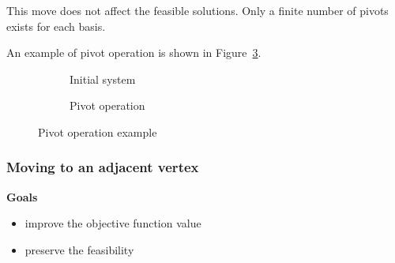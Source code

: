 \documentclass[english]{article}
\begin{document}
This move does not affect the feasible solutions.
Only a finite number of pivots exists for each basis.

\bigskip
An example of pivot operation is shown in Figure~\ref{fig:pivot-operation-example}.

\begin{figure}[htbp]
  \centering
  \bigskip
  \begin{subfigure}[b]{0.495\textwidth}
    \centering
    \bigskip
    \caption{Initial system}
    \label{fig:pivot-operation-example-1}
    \bigskip
  \end{subfigure}
  \begin{subfigure}[b]{0.495\textwidth}
    \centering
    \bigskip
    \caption{Pivot operation}
    \bigskip
    \label{fig:pivot-operation-example-2}
  \end{subfigure}

  \caption{Pivot operation example}
  \label{fig:pivot-operation-example}
  \bigskip
\end{figure}

\subsubsection{Moving to an adjacent vertex}

\textbf{Goals}
\begin{itemize}[label=\(\rightarrow\)]
  \item improve the objective function value
  \item preserve the feasibility
\end{itemize}
\end{document}
